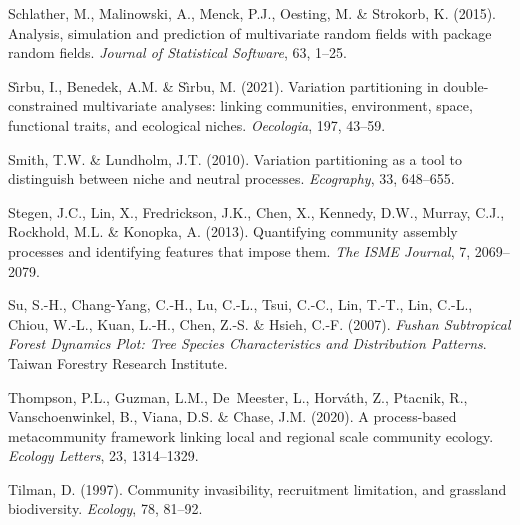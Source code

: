 \begin{thebibliography}{70}
	Schlather, M., Malinowski, A., Menck, P.J., Oesting, M. \& Strokorb, K. (2015).
	\newblock Analysis, simulation and prediction of multivariate random fields
	with package random fields.
	\newblock \emph{Journal of Statistical Software}, 63, 1--25.
	
	S{\^\i}rbu, I., Benedek, A.M. \& S{\^\i}rbu, M. (2021).
	\newblock Variation partitioning in double-constrained multivariate analyses:
	linking communities, environment, space, functional traits, and ecological
	niches.
	\newblock \emph{Oecologia}, 197, 43--59.
	
	Smith, T.W. \& Lundholm, J.T. (2010).
	\newblock Variation partitioning as a tool to distinguish between niche and
	neutral processes.
	\newblock \emph{Ecography}, 33, 648--655.
	
	Stegen, J.C., Lin, X., Fredrickson, J.K., Chen, X., Kennedy, D.W., Murray,
	C.J., Rockhold, M.L. \& Konopka, A. (2013).
	\newblock Quantifying community assembly processes and identifying features
	that impose them.
	\newblock \emph{The ISME Journal}, 7, 2069--2079.
	
	Su, S.-H., Chang-Yang, C.-H., Lu, C.-L., Tsui, C.-C., Lin, T.-T., Lin, C.-L., Chiou,
	W.-L., Kuan, L.-H., Chen, Z.-S. \& Hsieh, C.-F. (2007).
	\newblock \emph{Fushan Subtropical Forest Dynamics Plot: Tree Species
		Characteristics and Distribution Patterns}.
	\newblock Taiwan Forestry Research Institute.
	
	Thompson, P.L., Guzman, L.M., De~Meester, L., Horv{\'a}th, Z., Ptacnik, R.,
	Vanschoenwinkel, B., Viana, D.S. \& Chase, J.M. (2020).
	\newblock A process-based metacommunity framework linking local and regional
	scale community ecology.
	\newblock \emph{Ecology Letters}, 23, 1314--1329.
	
	Tilman, D. (1997).
	\newblock Community invasibility, recruitment limitation, and grassland
	biodiversity.
	\newblock \emph{Ecology}, 78, 81--92.
	

\end{thebibliography}

